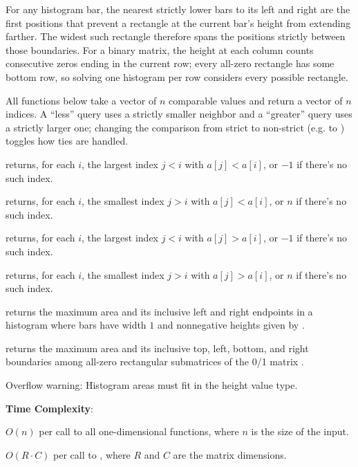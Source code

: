 For any histogram bar, the nearest strictly lower bars to its left and right are the first positions that prevent a rectangle at the current bar's height from extending farther. The widest such rectangle therefore spans the positions strictly between those boundaries. For a binary matrix, the height at each column counts consecutive zeros ending in the current row; every all-zero rectangle has some bottom row, so solving one histogram per row considers every possible rectangle.

All functions below take a vector  of $n$ comparable values and return a vector of $n$ indices. A ``less'' query uses a strictly smaller neighbor and a ``greater'' query uses a strictly larger one; changing the comparison from strict to non-strict (e.g. \inlinecode{\textgreater{}=} to \inlinecode{\textgreater{}}) toggles how ties are handled.

\begin{compactitem}
  \item {} returns, for each $i$, the largest index $j < i$ with $a[j] < a[i]$, or $-1$ if there's no such index.
  \item {} returns, for each $i$, the smallest index $j > i$ with $a[j] < a[i]$, or $n$ if there's no such index.
  \item {} returns, for each $i$, the largest index $j < i$ with $a[j] > a[i]$, or $-1$ if there's no such index.
  \item {} returns, for each $i$, the smallest index $j > i$ with $a[j] > a[i]$, or $n$ if there's no such index.
  \item {} returns the maximum area and its inclusive left and right endpoints in a histogram where bars have width $1$ and nonnegative heights given by .
  \item {} returns the maximum area and its inclusive top, left, bottom, and right boundaries among all-zero rectangular submatrices of the 0/1 matrix .
\end{compactitem}

Overflow warning: Histogram areas must fit in the height value type.

\textbf{Time Complexity}:
\begin{compactitem}
  \item $O(n)$ per call to all one-dimensional functions, where $n$ is the size of the input.
  \item $O(R \cdot C)$ per call to , where $R$ and $C$ are the matrix dimensions.
\end{compactitem}

